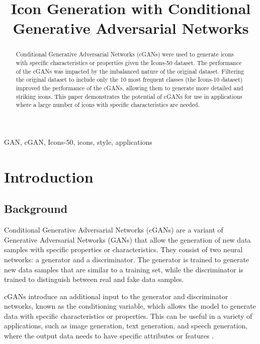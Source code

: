 \documentclass[conference]{IEEEtran}
\begin{document}
\title{Icon Generation with Conditional Generative Adversarial Networks}

\author{
}
\maketitle

\begin{abstract}
Conditional Generative Adversarial Networks (cGANs) were used to generate icons with specific characteristics or properties given the Icons-50 dataset. The performance of the cGANs was impacted by the imbalanced nature of the original dataset. Filtering the original dataset to include only the 10 most frequent classes (the Icons-10 dataset) improved the performance of the cGANs, allowing them to generate more detailed and striking icons. This paper demonstrates the potential of cGANs for use in applications where a large number of icons with specific characteristics are needed.
\end{abstract}

\begin{IEEEkeywords}
GAN, cGAN, Icons-50, icons, style, applications
\end{IEEEkeywords}

\section{Introduction}
\subsection{Background}
Conditional Generative Adversarial Networks (cGANs) \cite{Mirza2014} are a variant of Generative Adversarial Networks (GANs) that allow the generation of new data samples with specific properties or characteristics. They consist of two neural networks: a generator and a discriminator. The generator is trained to generate new data samples that are similar to a training set, while the discriminator is trained to distinguish between real and fake data samples.

cGANs introduce an additional input to the generator and discriminator networks, known as the conditioning variable, which allows the model to generate data with specific characteristics or properties. This can be useful in a variety of applications, such as image generation, text generation, and speech generation, where the output data needs to have specific attributes or features \cite{Mirza2014}.
\end{document}
